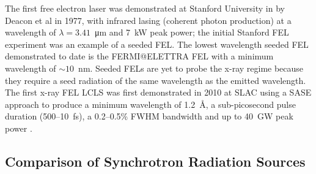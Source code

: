 \documentclass[../main.tex]{subfiles}
\begin{document}
The first free electron laser was demonstrated at Stanford University in by Deacon et al \cite{deacon1977first} in 1977, with infrared lasing (coherent photon production) at a wavelength of $\lambda = 3.41$~\si{\micro\meter} and 7~\si{\kilo\watt} peak power; the initial Stanford FEL experiment was an example of a seeded FEL. The lowest wavelength seeded FEL demonstrated to date is the FERMI@ELETTRA FEL \cite{allaria2012highly} with a minimum wavelength of $\sim10$~\si{\nano\meter}. Seeded FELs are yet to probe the x-ray regime because they require a seed radiation of the same wavelength as the emitted wavelength. The first x-ray FEL LCLS was first demonstrated in 2010 at SLAC using a SASE approach to produce a minimum wavelength of 1.2~\si{\angstrom}, a sub-picosecond pulse duration (500--10~\si{\femto\second}), a 0.2--0.5\% FWHM bandwidth and up to 40~\si{\giga\watt} peak power \cite{emma2010first}.

\subsection{Comparison of Synchrotron Radiation Sources}
\end{document}
